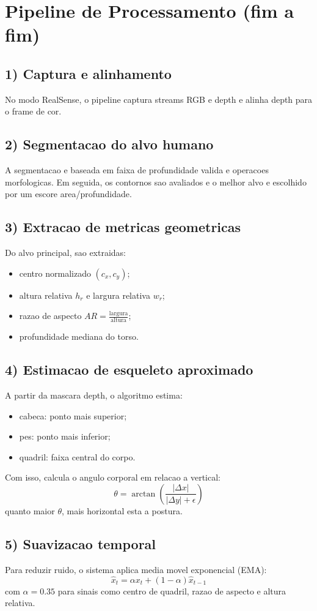 \documentclass[12pt,a4paper]{article}
\begin{document}
\section{Pipeline de Processamento (fim a fim)}
\subsection{1) Captura e alinhamento}
No modo RealSense, o pipeline captura streams RGB e depth e alinha depth para o frame de cor.

\subsection{2) Segmentacao do alvo humano}
A segmentacao e baseada em faixa de profundidade valida e operacoes morfologicas.
Em seguida, os contornos sao avaliados e o melhor alvo e escolhido por um escore area/profundidade.

\subsection{3) Extracao de metricas geometricas}
Do alvo principal, sao extraidas:
\begin{itemize}
    \item centro normalizado $(c_x, c_y)$;
    \item altura relativa $h_r$ e largura relativa $w_r$;
    \item razao de aspecto $AR = \frac{\text{largura}}{\text{altura}}$;
    \item profundidade mediana do torso.
\end{itemize}

\subsection{4) Estimacao de esqueleto aproximado}
A partir da mascara depth, o algoritmo estima:
\begin{itemize}
    \item cabeca: ponto mais superior;
    \item pes: ponto mais inferior;
    \item quadril: faixa central do corpo.
\end{itemize}
Com isso, calcula o angulo corporal em relacao a vertical:
\[
\theta = \arctan\left(\frac{|\Delta x|}{|\Delta y| + \epsilon}\right)
\]
quanto maior $\theta$, mais horizontal esta a postura.

\subsection{5) Suavizacao temporal}
Para reduzir ruido, o sistema aplica media movel exponencial (EMA):
\[
\hat{x}_t = \alpha x_t + (1-\alpha)\hat{x}_{t-1}
\]
com $\alpha = 0.35$ para sinais como centro de quadril, razao de aspecto e altura relativa.
\end{document}
